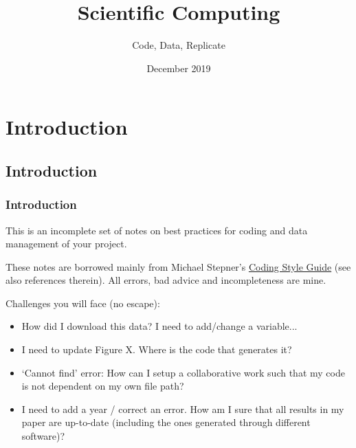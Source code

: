 \documentclass{beamer}
\title{Scientific Computing}
\subtitle{Code, Data, Replicate}
\institute{\begin{normalsize} PhD in Economics \& Finance, \\\vspace{0.2cm} Universit\`{a} della Svizzera italiana \\\vspace{0.2cm}\end{normalsize}}
\date{December 2019}
\begin{document}
\setlength{\unitlength}{\textwidth}  %



\frame{\titlepage}


\section{Introduction}
\subsection{Introduction}
\frame
{
	\frametitle{Introduction}
	This is an incomplete set of notes on best practices for coding and data management of your project.\linebreak
	
	These notes are borrowed mainly from Michael Stepner's  \href{https://github.com/michaelstepner/healthinequality-code}{Coding Style Guide} (see also references therein). All errors, bad advice and incompleteness are mine.\linebreak
	
	Challenges you will face (no escape):
	
	\begin{itemize}
		\item  How did I download this data? I need to add/change a variable...
		\item I need to update Figure X. Where is the code that generates it?
		\item `Cannot find' error: How can I setup a collaborative work such that my code is not dependent on my own file path?
		\item I need to add a year / correct an error. How am I sure that all results in my paper are up-to-date (including the ones generated through different software)?   
	\end{itemize}
	
	
}
\end{document}
